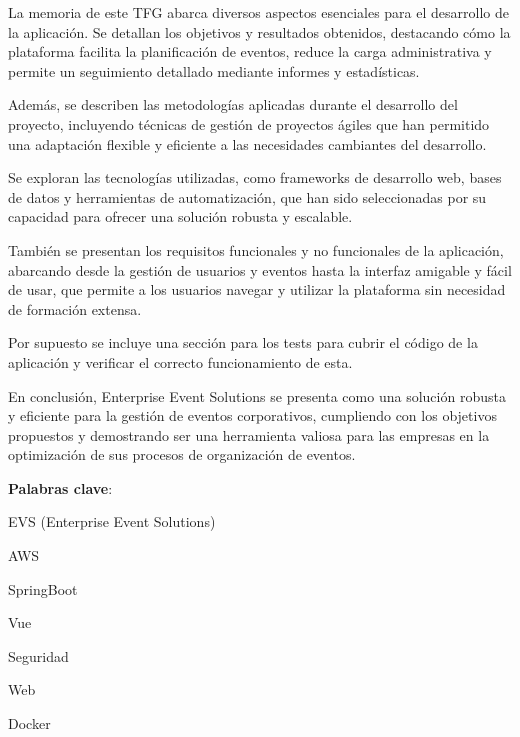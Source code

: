 \documentclass[12pt,twoside,titlepage]{report}
\newcommand\blankpage{%
    \newpage
    \null
    \thispagestyle{empty}%
    \newpage}
\begin{document}
La memoria de este TFG abarca diversos aspectos esenciales para el desarrollo de la aplicación. Se detallan los objetivos y resultados obtenidos, destacando cómo la 
plataforma facilita la planificación de eventos, reduce la carga administrativa y permite un seguimiento detallado mediante informes y estadísticas.

Además, se describen las metodologías aplicadas durante el desarrollo del proyecto, incluyendo técnicas de gestión de proyectos ágiles que han permitido una adaptación 
flexible y eficiente a las necesidades cambiantes del desarrollo.

Se exploran las tecnologías utilizadas, como frameworks de desarrollo web, bases de datos y herramientas de automatización, que han sido seleccionadas por su capacidad 
para ofrecer una solución robusta y escalable.

También se presentan los requisitos funcionales y no funcionales de la aplicación, abarcando desde la gestión de usuarios y eventos hasta la interfaz amigable y fácil de 
usar, que permite a los usuarios navegar y utilizar la plataforma sin necesidad de formación extensa.

Por supuesto se incluye una sección para los tests para cubrir el código de la aplicación y verificar el correcto funcionamiento de esta.

En conclusión, Enterprise Event Solutions se presenta como una solución robusta y eficiente para la gestión de eventos corporativos, cumpliendo con los objetivos propuestos
y demostrando ser una herramienta valiosa para las empresas en la optimización de sus procesos de organización de eventos.
\mbox{} \bigskip

\noindent \textbf{Palabras clave}:
\begin{compactitem}
    \item EVS (Enterprise Event Solutions)
    \item AWS
    \item SpringBoot
    \item Vue
    \item Seguridad
    \item Web
    \item Docker
\end{compactitem}

\afterpage{\blankpage}

\end{document}
